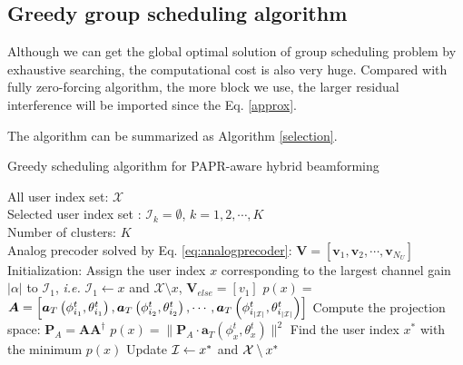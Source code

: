\documentclass[conference]{IEEEtran}
\def\argmin{\mathop{\mbox{arg\,min}}}
\begin{document}
\subsection{Greedy group scheduling algorithm}
Although we can get the global optimal solution of group scheduling problem by exhaustive searching, the computational cost is also very huge. Compared with fully zero-forcing algorithm, the more block we use, the  larger residual interference will be imported since the Eq. \eqref{approx}.

The algorithm can be summarized as Algorithm \ref{selection}.
\begin{algorithm}[h] 		
	\caption{Greedy scheduling algorithm for PAPR-aware hybrid beamforming}
	\label{selection}
	\begin{algorithmic}
		\REQUIRE  \quad
		\STATE	All user index set: $\mathcal{X}$\\
		\STATE  Selected user index set : $\mathcal{I}_k=\emptyset$, $k=1,2,\cdots, K$\\
		\STATE  Number of clusters: $K$\\
		\STATE  Analog precoder solved by Eq. \eqref{eq:analogprecoder}: $\bm{V}=[\bm{v}_1,\bm{v}_2,\cdots,\bm{v}_{N_U}]$
		\ENSURE   	
		\STATE Initialization: Assign the user index $x$ corresponding to the largest channel gain $|\alpha|$ to ${\mathcal I}_1$, {\em i.e.} $\mathcal{I}_1 \leftarrow  x$ and ${\mathcal X}\setminus x$, 
		\STATE $\bm{V}_{else} = [v_1]$
		\STATE $p(x) = $
		\ENDFOR
		\STATE ${\bm A}=\left[\bm{a}_{T}\left(\phi^t_{i_1},\theta^t_{i_1}\right),\bm{a}_{T}\left(\phi^t_{i_2},\theta^t_{i_2}\right),\cdots,\bm{a}_{T}\left(\phi^t_{i_{|{\cal I}|}},\theta^t_{i_{|{\cal I}|}}\right)\right]$
		\STATE Compute the projection space: ${\bm P}_A = {\bm A}{\bm A}^{\dagger}$ 		 				
		\STATE $p(x) = \|{\bm P}_A\cdot {\bm a}_T\left(\phi^t_{x},\theta^t_{x}\right)\|^2$ 				 								
		\ENDFOR
		\STATE  Find the user index $x^*$ with the minimum $p(x)$ 									
		\STATE	Update ${\cal I} \leftarrow  x^*$ and ${\cal X}\setminus x^*$	
		\ENDWHILE	
	\end{algorithmic}
\end{algorithm}
\end{document}
